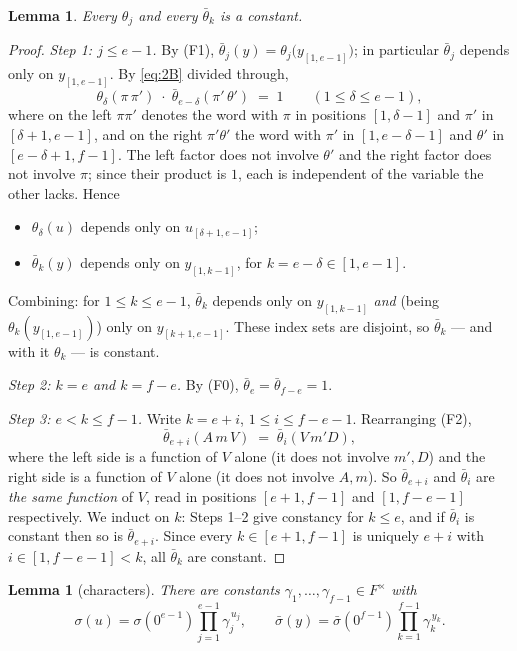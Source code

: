 \documentclass[11pt]{article}
\newtheorem{lemma}[theorem]{Lemma}
\theoremstyle{definition}
\theoremstyle{remark}
\begin{document}
\begin{lemma}\label{lem:const}
Every $\theta_j$ and every $\bar\theta_k$ is a constant.
\end{lemma}

\begin{proof}
\emph{Step 1: $j\le e-1$.}  By (F1), $\bar\theta_j(y)=\theta_j\bigl(y_{[1,e-1]}\bigr)$; in
particular $\bar\theta_j$ depends only on $y_{[1,e-1]}$.  By \eqref{eq:2B} divided
through,
\begin{equation}\label{eq:2Bratio}
   \theta_\delta(\pi\,\pi')\;\cdot\;\bar\theta_{e-\delta}(\pi'\,\theta')\;=\;1
   \qquad(1\le\delta\le e-1),
\end{equation}
where on the left $\pi\pi'$ denotes the word with $\pi$ in positions $[1,\delta-1]$ and
$\pi'$ in $[\delta+1,e-1]$, and on the right $\pi'\theta'$ the word with $\pi'$ in
$[1,e-\delta-1]$ and $\theta'$ in $[e-\delta+1,f-1]$.  The left factor does not involve
$\theta'$ and the right factor does not involve $\pi$; since their product is $1$, each is
independent of the variable the other lacks.  Hence
\begin{itemize}
\item $\theta_\delta(u)$ depends only on $u_{[\delta+1,e-1]}$;
\item $\bar\theta_{k}(y)$ depends only on $y_{[1,k-1]}$, for $k=e-\delta\in[1,e-1]$.
\end{itemize}
Combining: for $1\le k\le e-1$, $\bar\theta_k$ depends only on $y_{[1,k-1]}$ \emph{and}
(being $\theta_k(y_{[1,e-1]})$) only on $y_{[k+1,e-1]}$.  These index sets are disjoint,
so $\bar\theta_k$ --- and with it $\theta_k$ --- is constant.

\emph{Step 2: $k=e$ and $k=f-e$.}  By (F0), $\bar\theta_e=\bar\theta_{f-e}=1$.

\emph{Step 3: $e<k\le f-1$.}  Write $k=e+i$, $1\le i\le f-e-1$.  Rearranging (F2),
\[
   \bar\theta_{e+i}(A\,m\,V)\;=\;\bar\theta_{i}(V\,m'D),
\]
where the left side is a function of $V$ alone (it does not involve $m',D$) and the right
side is a function of $V$ alone (it does not involve $A,m$).  So $\bar\theta_{e+i}$ and
$\bar\theta_i$ are \emph{the same function} of $V$, read in positions $[e+1,f-1]$ and
$[1,f-e-1]$ respectively.  We induct on $k$: Steps 1--2 give constancy for $k\le e$, and
if $\bar\theta_i$ is constant then so is $\bar\theta_{e+i}$.  Since every
$k\in[e+1,f-1]$ is uniquely $e+i$ with $i\in[1,f-e-1]<k$, all $\bar\theta_k$ are constant.
\end{proof}

\begin{lemma}[characters]\label{lem:char}
There are constants $\gamma_1,\dots,\gamma_{f-1}\in F^\times$ with
\[
   \sigma(u)=\sigma(0^{e-1})\prod_{j=1}^{e-1}\gamma_j^{\,u_j},\qquad
   \bar\sigma(y)=\bar\sigma(0^{f-1})\prod_{k=1}^{f-1}\gamma_k^{\,y_k}.
\]
\end{lemma}
\end{document}
